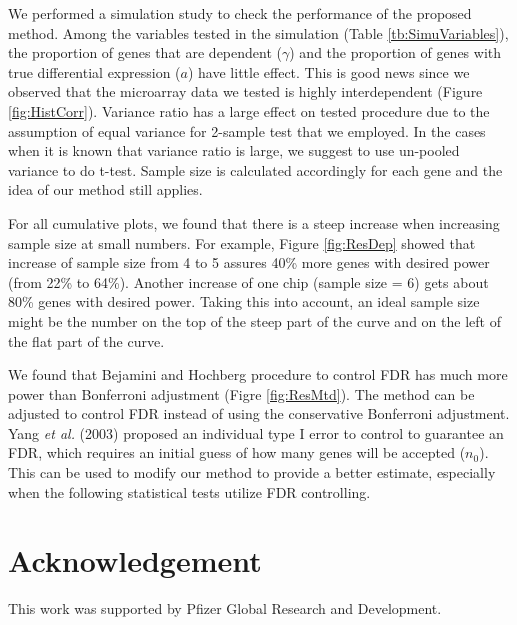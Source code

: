 \documentclass{bioinfo}
\begin{document}
We performed a simulation study to check the performance of the
proposed method. Among the variables tested in the simulation
(Table \ref{tb:SimuVariables}), the proportion of genes that are
dependent ($\gamma$) and the proportion of genes with true
differential expression ($a$) have little effect. This is good
news since we observed that the microarray data we tested is
highly interdependent (Figure \ref{fig:HistCorr}). Variance ratio
has a large effect on tested procedure due to the assumption of
equal variance for 2-sample test that we employed. In the cases
when it is known that variance ratio is large, we suggest to use
un-pooled variance to do t-test. Sample size is calculated
accordingly for each gene and the idea of our method still
applies.

For all cumulative plots, we found that there is a steep increase when increasing sample size at small numbers. For example,
Figure \ref{fig:ResDep} showed that increase of sample size from 4 to 5 assures 40\% more genes with desired power (from 22\%
to 64\%). Another increase of one chip (sample size = 6) gets about 80\% genes with desired power. Taking this into account, an
ideal sample size might be the number on the top of the steep part of the curve and on the left of the flat part of the curve.

We found that Bejamini and Hochberg procedure to control FDR has much more power than Bonferroni adjustment (Figre
\ref{fig:ResMtd}). The method can be adjusted to control FDR instead of using the conservative Bonferroni adjustment. Yang
\textit{et al.} (2003) proposed an individual type I error to control to guarantee an FDR, which requires an initial guess of
how many genes will be accepted ($n_0$). This can be used to modify our method to provide a better estimate, especially when
the following statistical tests utilize FDR controlling.


\section*{Acknowledgement}
This work was supported by Pfizer Global Research and Development.
\end{document}

